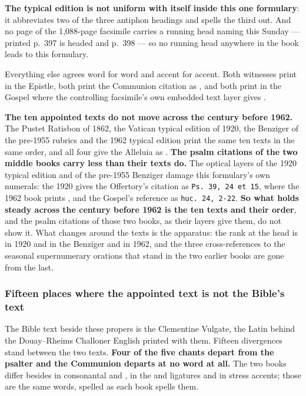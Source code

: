\textbf{The typical edition is not uniform with itself inside this one
formulary}: it abbreviates two of the three antiphon headings and spells the
third out. And no page of the 1,088-page facsimile carries a running head
naming this Sunday --- printed p.~397 is headed  and p.~398  --- so no running
head anywhere in the book leads to this formulary.

Everything else agrees word for word and accent for accent. Both witnesses
print  in the Epistle, both print the Communion citation as
, and both print  in the Gospel where
the controlling facsimile's own embedded text layer gives .

\textbf{The ten appointed texts do not move across the century before 1962.}
The Pustet Ratisbon of 1862, the Vatican typical edition of 1920, the Benziger
 of the pre-1955 rubrics and the 1962 typical edition print
the same ten texts in the same order, and all four give the Alleluia as
. \textbf{The psalm citations of the two
middle books carry less than their texts do.} The optical layers of the 1920
typical edition and of the pre-1955 Benziger damage this formulary's own
numerals: the 1920 gives the Offertory's citation as \texttt{Ps. 39, 24 et 15},
where the 1962 book prints , and the Gospel's reference
as \texttt{huc. 24, 2-22}. \textbf{So what holds steady across the century
before 1962 is the ten texts and their order}, and the psalm citations of those two books, as their layers give them, do not
show it. What changes around the texts is the
apparatus: the rank at the head is  in 1920 and in
the Benziger and  in 1962, and the three cross-references to
the seasonal supernumerary orations that stand in the two earlier books are gone
from the last.

\subsubsection*{Fifteen places where the appointed text is not the Bible's text}

The Bible text beside these propers is the Clementine Vulgate, the Latin behind
the Douay--Rheims Challoner English printed with them. Fifteen
divergences stand between the two texts. \textbf{Four of the five chants depart
from the psalter and the Communion departs at no word at all.} The two books differ
besides in consonantal  and , in the  and 
ligatures and in stress accents; those are the same words, spelled as each book
spells them.


